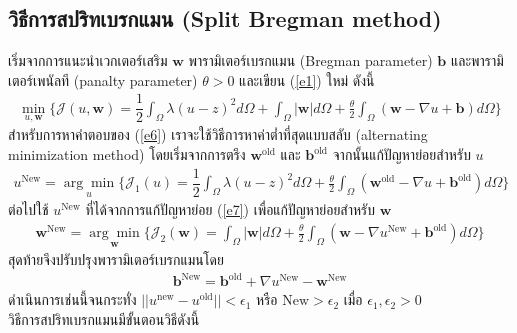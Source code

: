 \subsection{วิธีการสปริทเบรกแมน (Split Bregman method)}

\hspace{1cm} เริ่มจากการแนะนำเวกเตอร์เสริม $\boldsymbol{w}$ พารามิเตอร์เบรกแมน (Bregman parameter) $\boldsymbol{b}$ และพารามิเตอร์เพนัลที (panalty parameter) $\theta>0$ และเขียน (\ref{e1}) ใหม่ ดังนี้
\begin{align}
	\min_{u,\boldsymbol{w}} \{ \mathcal{J}(u,\boldsymbol{w}) = \dfrac{1}{2} \int_{\Omega} \lambda(u-z)^2 d\Omega +  \int_{\Omega}  | \boldsymbol{w}|  d\Omega + \frac{\theta}{2} \int_{\Omega} (\boldsymbol{w} - \nabla u + \boldsymbol{b}) d\Omega \}
	\label{e6}
\end{align}
\hspace{1cm}สำหรับการหาคำตอบของ (\ref{e6}) เราจะใช้วิธีการหาค่าต่ำที่สุดแบบสลับ (alternating minimization method) โดยเริ่มจากการตรึง $\boldsymbol{w}^{\text{old}}$ และ $\boldsymbol{b}^{\text{old}}$ จากนั้นแก้ปัญหาย่อยสำหรับ $u$
\begin{align}
	u^{\text{New}}=\underset{u}{\arg\min} \{ \mathcal{J}_1(u) = \dfrac{1}{2} \int_{\Omega} \lambda(u-z)^2 d\Omega + \frac{\theta}{2} \int_{\Omega} (\boldsymbol{w}^{\text{old}} - \nabla u + \boldsymbol{b}^{\text{old}}) d\Omega \}
	\label{e7}
\end{align}
ต่อไปใช้ $u^{\text{New}}$ ที่ได้จากการแก้ปัญหาย่อย (\ref{e7}) เพื่อแก้ปัญหาย่อยสำหรับ $\boldsymbol{w}$
\begin{align}
	\boldsymbol{w}^{\text{New}}=\underset{\boldsymbol{w}}{\arg\min} \{ \mathcal{J}_2(\boldsymbol{w}) = \int_{\Omega}  |\boldsymbol{w}|  d\Omega  + \frac{\theta}{2} \int_{\Omega} (\boldsymbol{w} - \nabla u^{\text{New}} + \boldsymbol{b}^{\text{old}}) d\Omega \}
	\label{e8}
\end{align}
	สุดท้ายจึงปรับปรุงพารามิเตอร์เบรกแมนโดย 
\begin{align}
	\boldsymbol{b}^{\text{New}}=\boldsymbol{b}^{\text{old}}+\nabla u^{\text{New}}-\boldsymbol{w}^{\text{New}}
	\label{e9}
\end{align}
ดำเนินการเช่นนี้จนกระทั่ง $||u^{\text{new}}-u^{\text{old}}||< \epsilon_1$ หรือ $\text{New}>\epsilon_2$ เมื่อ $\epsilon_1,\epsilon_2>0$ \\ 
\vspace{0.5cm}
\hspace{1cm}วิธีการสปริทเบรกแมนมีขั้นตอนวิธีดังนี้ \\
\vspace{0.5cm}
